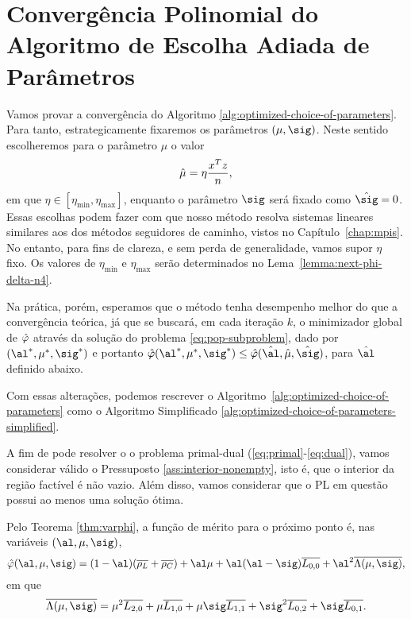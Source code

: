

\section{Convergência  Polinomial do Algoritmo de Escolha Adiada de Parâmetros}



Vamos provar  a convergência do Algoritmo \ref{alg:optimized-choice-of-parameters}. Para tanto, estrategicamente fixaremos os parâmetros $(\mu,\sig)$. Neste sentido escolheremos para o parâmetro  $\mu$ o valor \[\hat{\mu}=\eta\dfrac{x^Tz}{n},
\] 
em que $\eta\in [\eta_{\min},\eta_{\max} ]$, enquanto o parâmetro $\sig$ será fixado como $\nextsig = 0$. Essas escolhas  podem fazer com que nosso método resolva  sistemas lineares similares aos dos métodos seguidores de caminho, vistos no Capítulo~\ref{chap:mpis}.  No entanto, para fins de clareza, e sem perda de generalidade, vamos supor $\eta$ fixo. Os valores de $\eta_{\min}$ e $\eta_{\max}$ serão determinados no Lema~\ref{lemma:next-phi-delta-n4}.


 Na prática, porém, esperamos que  o método  tenha desempenho melhor do que a convergência teórica, já que se buscará, em cada iteração $k$,
o minimizador global de $\hat{\varphi}$ através da solução do problema \eqref{eq:pop-subproblem}, dado por $(\al^*,\mu^*,\sig^*)$ e portanto	$\nextphi(\al^*,\mu^*,\sig^*)\leq \nextphi(\hat{\al},\nextmu,\nextsig)$, para  $\hat{\al}$ definido abaixo.


Com essas alterações, podemos rescrever o Algoritmo~\ref{alg:optimized-choice-of-parameters} como o  Algoritmo Simplificado \ref{alg:optimized-choice-of-parameters-simplified}.


A fim de pode  resolver o o problema primal-dual (\ref{eq:primal}-\ref{eq:dual}), vamos considerar válido o Pressuposto \ref{ass:interior-nonempty}, isto é, que o interior da região factível é não vazio. Além disso, vamos considerar que o \ac{PL} em questão possui ao menos uma solução ótima. 





Pelo Teorema \ref{thm:varphi}, a função de mérito para o próximo ponto   é, nas variáveis  $(\al,\mu,\sig)$,
\begin{equation*}
{\nextphi}(\al,\mu,\sig) =  (1-\al)(\dbvec{\rho_L} +
\dbvec{\rho_C}) + \al\mu + \al(\al-\sig)\dbvec{L_{0,0}} +
\al^2\dbvec{\Lambda(\mu,\sig)} ,
\end{equation*}
em que 
\[
\dbvec{\Lambda(\mu,\sig)} = \mu^2
 \dbvec{L_{2,0}} + \mu \dbvec{L_{1,0}} + 	\mu \sig \dbvec{L_{1,1}} +
 \sig^2 \dbvec{L_{0,2}} + \sig \dbvec{L_{0,1}}.
 \]


